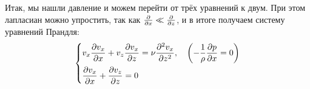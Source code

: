 Итак, мы нашли давление и можем перейти от трёх уравнений к двум. При этом лапласиан можно упростить, так как $\pdv{x} \ll \pdv{z}$, и в итоге получаем систему уравнений Прандля:
\begin{gather}
    \left\{\begin{aligned}
        &v_x \pdv{v_x}{x}+v_z\pdv{v_x}{z}=\nu\pdv[2]{v_x}{z}, \quad
        \qty(-\frac{1}{\rho}\pdv{p}{x}=0)\\
        &\pdv{v_x}{x}+\pdv{v_z}{z}=0
    \end{aligned}\right.
    \end{gather}






